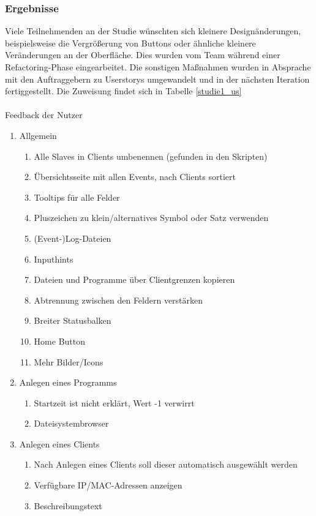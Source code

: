 \subsubsection{Ergebnisse}
Viele Teilnehmenden an der Studie wünschten sich kleinere Designänderungen, beispielsweise die Vergrößerung von
Buttons oder ähnliche kleinere Veränderungen an der Oberfläche. Dies wurden vom Team während einer Refactoring-Phase
eingearbeitet. Die sonstigen Maßnahmen wurden in Absprache mit den Auftraggebern zu Userstorys umgewandelt und
in der nächsten Iteration fertiggestellt. Die Zuweisung findet sich in Tabelle \ref{studie1_us}
\\\\
{\large Feedback der Nutzer\\}
\begin{enumerate}
\item Allgemein
\begin{enumerate}
	\item Alle Slaves in Clients umbenennen (gefunden in den Skripten)
	\item Übersichtsseite mit allen Events, nach Clients sortiert
	\item Tooltips für alle Felder
	\item Pluszeichen zu klein/alternatives Symbol oder Satz verwenden
	\item (Event-)Log-Dateien
	\item Inputhints
	\item Dateien und Programme über Clientgrenzen kopieren
	\item Abtrennung zwischen den Feldern verstärken
	\item Breiter Statusbalken
	\item Home Button
	\item Mehr Bilder/Icons
\end{enumerate}
\item Anlegen eines Programms
\begin{enumerate}
	\item Startzeit ist nicht erklärt, Wert -1 verwirrt
	\item Dateisystembrowser
\end{enumerate}
\item Anlegen eines Clients
\begin{enumerate}
	\item Nach Anlegen eines Clients soll dieser automatisch ausgewählt werden
	\item Verfügbare IP/MAC-Adressen anzeigen
	\item Beschreibungstext

\end{enumerate}
\end{enumerate}
